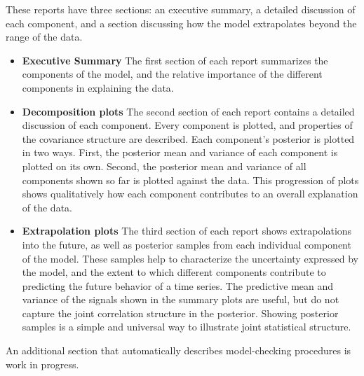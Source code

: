 \documentclass{article} %
\begin{document}
These reports have three sections: an executive summary, a detailed discussion of each component, and a section discussing how the model extrapolates beyond the range of the data.

\begin{itemize}
\item { \bf Executive Summary} The first section of each report summarizes the components of the model, and the relative importance of the different components in explaining the data.
\item { \bf Decomposition plots}
The second section of each report contains a detailed discussion of each component.
Every component is plotted, and properties of the covariance structure are described.
Each component's posterior is plotted in two ways.  First, the posterior mean and variance of each component is plotted on its own.  Second, the posterior mean and variance of all components shown so far is plotted against the data.  This progression of plots 
shows qualitatively how each component contributes to an overall explanation of the data.
\item {\bf Extrapolation plots}
The third section of each report shows extrapolations into the future, as well as posterior samples from each individual component of the model.  These samples help to characterize the uncertainty expressed by the model, and the extent to which different components contribute to predicting the future behavior of a time series.
%
The predictive mean and variance of the signals shown in the summary plots are useful, but do not capture the joint correlation structure in the posterior.  Showing posterior samples is a simple and universal way to illustrate joint statistical structure.
\end{itemize}
%
An additional section that automatically describes model-checking procedures is work in progress.

\end{document}
